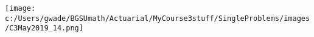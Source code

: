 
\texttt{[image: c:/Users/gwade/BGSUmath/Actuarial/MyCourse3stuff/SingleProblems/images/C3May2019\_14.png]}

\showsol{\bsoln

\esoln}
